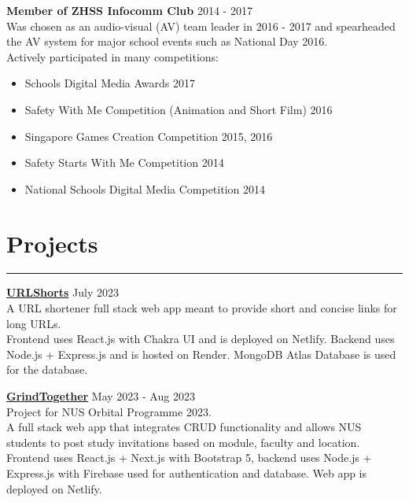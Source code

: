 \documentclass[letterpaper,11pt]{article}
\begin{document}
    \vspace{0.5em}
    \textbf{Member of ZHSS Infocomm Club} \hfill 2014 - 2017
    \\
    Was chosen as an audio-visual (AV) team leader in 2016 - 2017 and spearheaded the AV system for 
    major school events such as National Day 2016.
    \\
    \vspace{0.5em}
    Actively participated in many competitions:
    \\
    \vspace{-0.75em}
    \begin{itemize}[itemsep=-0.5em, label=\textbullet]
        \item Schools Digital Media Awards  \hfill 2017
        \item Safety With Me Competition (Animation and Short Film) \hfill 2016
        \item Singapore Games Creation Competition \hfill 2015, 2016
        \item Safety Starts With Me Competition \hfill 2014
        \item National Schools Digital Media Competition \hfill 2014
    \end{itemize}

     
    \section{Projects}
    \vspace{-0.5em}
    \hrule
    \vspace{0.5em}
    \textbf{\href {https://github.com/tjch-o/URLShorts}{URLShorts}} \hfill July 2023
    \\
    A URL shortener full stack web app meant to provide short and concise links for long URLs.
    \\
    Frontend uses React.js with Chakra UI and is deployed on Netlify. Backend uses Node.js + 
    Express.js and is hosted on Render. MongoDB Atlas Database is used for the database.

    \vspace{0.5em}
    \textbf{\href {https://github.com/McNaBry/orbital-grindtogether}{GrindTogether}} \hfill May 2023
    - Aug 2023
    \\
    Project for NUS Orbital Programme 2023.
    \\
    A full stack web app that integrates CRUD functionality and allows NUS students to post 
    study invitations based on module, faculty and location. 
    \\
    Frontend uses React.js + Next.js with Bootstrap 5, backend uses Node.js + Express.js with 
    Firebase used for authentication and database. Web app is deployed on Netlify.
     
\end{document}
